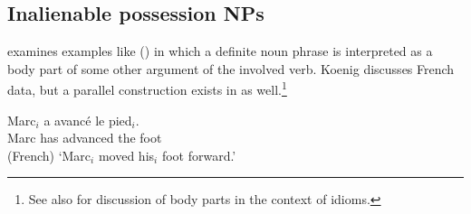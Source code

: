 \documentclass[output=paper
 	        ,biblatex
                ,babelshorthands
                ,newtxmath
                ,draftmode
                ,colorlinks, citecolor=brown
]{langscibook}
\begin{document}






\subsection{Inalienable possession NPs}

\citet{Koenig1999b} examines examples like () in which a definite noun phrase is interpreted
as a body part of some other argument of the involved verb. Koenig discusses French data, but a
parallel construction exists in  as well.\footnote{
See also \crossrefchapterw[\page \pageref{ex-herz-augen}]{idioms} for discussion of body parts in
the context of idioms.
}

\ea
\label{ex-marc-avance-le-pied}
\gll Marc$_i$ a avancé le pied$_i$.\\
     Marc     has advanced the foot\\\hfill{(French)}
\glt `Marc$_i$ moved his$_i$ foot forward.'
\z
\end{document}
